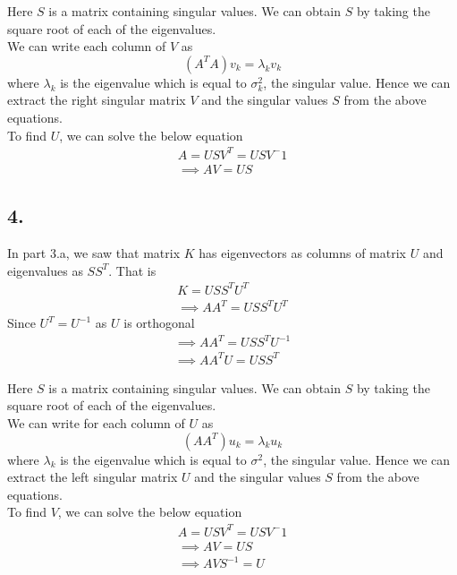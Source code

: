 \documentclass[11pt]{article}
\begin{document}
{Here $S$ is a matrix containing singular values. We can obtain $S$ by taking the square root of each of the eigenvalues.\\

We can write each column of $V$ as
$$(A^TA) v_k = \lambda_k v_k$$ where $\lambda_k$ is the eigenvalue which is equal to $\sigma_k^2$, the singular value. Hence we can extract the right singular matrix $V$ and the singular values $S$ from the above equations.\\

To find $U$, we can solve the below equation
\begin{align*}
A = U S V^T = U S V^-1\\
\implies A V = U S
\end{align*}	

\pagebreak[4]
\subsection*{4.}

In part 3.a, we saw that matrix $K$ has eigenvectors as columns of matrix $U$ and eigenvalues as $S S^T$. That is
\begin{align*}
K = U S S^T U^T\\
\implies A A^T = U S S^T U^T
\end{align*}
Since $U^T = U^{-1}$ as $U$ is orthogonal
\begin{align*}
\implies A A^T = U S S^T U^{-1}\\
\implies A A^T U = U S S^T
\end{align*}

Here $S$ is a matrix containing singular values. We can obtain $S$ by taking the square root of each of the eigenvalues.\\

We can write for each column of $U$ as
$$(AA^T) u_k = \lambda_k u_k$$ where $\lambda_k$ is the eigenvalue which is equal to $\sigma^2$, the singular value. Hence we can extract the left singular matrix $U$ and the singular values $S$ from the above equations.\\

To find $V$, we can solve the below equation
\begin{align*}
A = U S V^T = U S V^-1\\
\implies A V = U S\\
\implies A V S^{-1} = U
\end{align*}	

\pagebreak[4]
}
\end{document}
